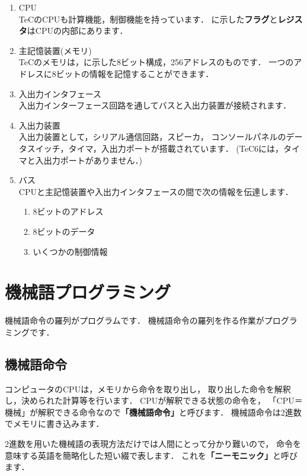 \begin{enumerate}
\item CPU \\
TeCのCPUも計算機能，制御機能を持っています．
に示した{\bf フラグ}と{\bf レジスタ}はCPUの内部にあります．
\item 主記憶装置(メモリ) \\
TeCのメモリは，に示した8ビット構成，256アドレスのものです．
一つのアドレスに8ビットの情報を記憶することができます．
\item 入出力インタフェース \\
入出力インターフェース回路を通してバスと入出力装置が接続されます．
\item 入出力装置 \\
入出力装置として，シリアル通信回路，スピーカ，
コンソールパネルのデータスイッチ，タイマ，入出力ポートが搭載されています．
(TeC6には，タイマと入出力ポートがありません．)
\item バス \\
CPUと主記憶装置や入出力インタフェースの間で次の情報を伝達します．
\begin{enumerate}
\item 8ビットのアドレス
\item 8ビットのデータ
\item いくつかの制御情報
\end{enumerate}
\end{enumerate}

\section{機械語プログラミング}
機械語命令の羅列がプログラムです．
機械語命令の羅列を作る作業がプログラミングです．

\subsection{機械語命令}
コンピュータのCPUは，メモリから命令を取り出し，
取り出した命令を解釈し，決められた計算等を行います．
CPUが解釈できる状態の命令を，
「CPU＝機械」が解釈できる命令なので{\bf 「機械語命令」}と呼びます．
機械語命令は2進数でメモリに書き込みます．

2進数を用いた機械語の表現方法だけでは人間にとって分かり難いので，
命令を意味する英語を簡略化した短い綴で表します．
これを{\bf 「ニーモニック」}と呼びます．

